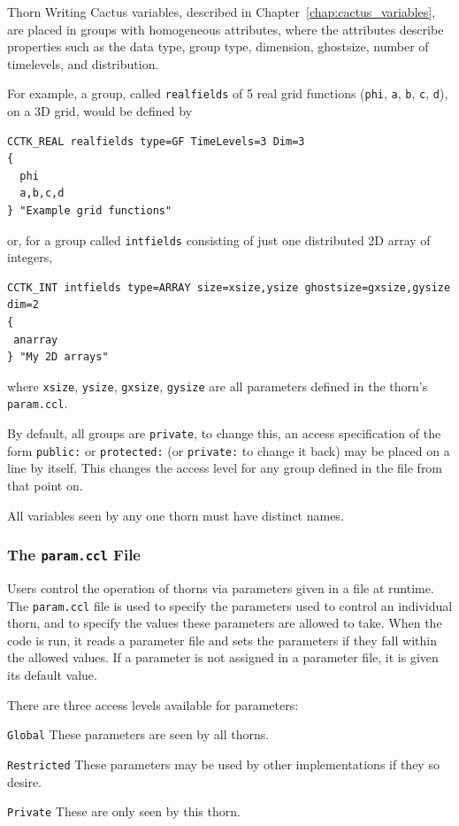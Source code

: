 \begin{cactuspart}{Thorn Writing}
Cactus variables, described in Chapter~\ref{chap:cactus_variables}, are placed
in groups with homogeneous attributes, where
the attributes describe properties such as the data type, group type,
dimension, ghostsize, number of timelevels, and
distribution.

For example, a group, called \texttt{realfields} of 5 real grid
functions (\texttt{phi}, \texttt{a},
\texttt{b}, \texttt{c}, \texttt{d}), on a 3D grid, would be defined by
\begin{verbatim}
CCTK_REAL realfields type=GF TimeLevels=3 Dim=3
{
  phi
  a,b,c,d
} "Example grid functions"
\end{verbatim}
or, for a group called \texttt{intfields} consisting of just one
distributed 2D array of integers,
\begin{verbatim}
CCTK_INT intfields type=ARRAY size=xsize,ysize ghostsize=gxsize,gysize dim=2
{
 anarray
} "My 2D arrays"
\end{verbatim}
where \texttt{xsize}, \texttt{ysize}, \texttt{gxsize}, \texttt{gysize} are all
parameters defined in the thorn's \texttt{param.ccl}.


By default, all groups are \texttt{private}, to change this, an access
specification of the form \texttt{public:} or \texttt{protected:} (or
\texttt{private:} to change it back) may be placed on a line by itself.  This
changes the access level for any group defined in the file from that point on.

All variables seen by any one thorn must have distinct names.

\subsubsection{The \texttt{param.ccl} File}
\label{subsec:param_ccl}

Users control the operation of thorns via parameters given in a file
at runtime.  The \texttt{param.ccl} file
is used to specify the parameters used to control an individual thorn, and
to specify the values these parameters are allowed to take.  When the code
is run, it reads a parameter file and sets the parameters if they fall
within the allowed values. If a parameter is not assigned in a parameter
file, it is given its default value.

There are three access levels available for parameters:

\begin{Lentry}
\item [\texttt{Global}]
These parameters are seen by all thorns.
\item [\texttt{Restricted}]
These parameters may be used by other implementations if they so desire.
\item [\texttt{Private}]
These are only seen by this thorn.
\end {Lentry}


\end{cactuspart}
